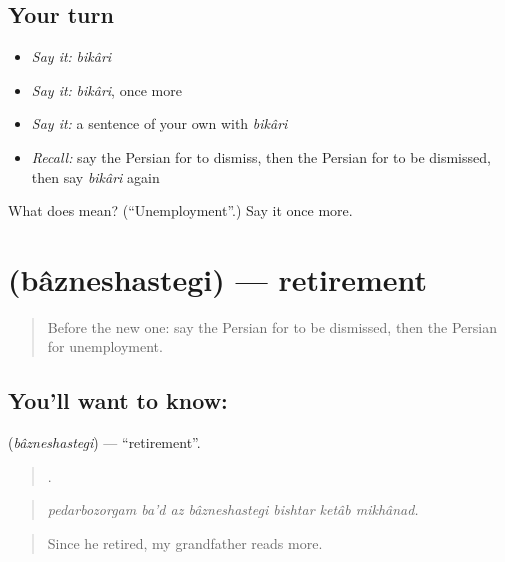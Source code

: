 \subsection*{Your turn}
\begin{itemize}
\raggedright
  \item \emph{Say it:} \emph{bikâri}
  \item \emph{Say it:} \emph{bikâri}, once more
  \item \emph{Say it:} a sentence of your own with \emph{bikâri}
  \item \emph{Recall:} say the Persian for to dismiss, then the Persian for to be dismissed, then say \emph{bikâri} again
\end{itemize}

\begin{tcolorbox}[breakable,colback=teal!4,colframe=teal!35!black,title={Before you move on}]
What does  mean? (\textquotedblleft{}Unemployment\textquotedblright{}.) Say it once more.
\end{tcolorbox}
\section[\texorpdfstring{\fa{بازنشستگی} (bâzneshastegi)}{بازنشستگی (bâzneshastegi)}]{ (bâzneshastegi) — retirement}

\label{lesson:FA-C379-bazneshastegi}



\begin{quote}
Before the new one: say the Persian for to be dismissed, then the Persian for unemployment.
\end{quote}

\subsection*{You'll want to know: }
\textbf{} (\emph{bâzneshastegi}) — \textquotedblleft{}retirement\textquotedblright{}.

\begin{quote}
      .
\end{quote}

\begin{quote}
\emph{pedarbozorgam ba'd az bâzneshastegi bishtar ketâb mikhânad.}
\end{quote}

\begin{quote}
Since he retired, my grandfather reads more.
\end{quote}

